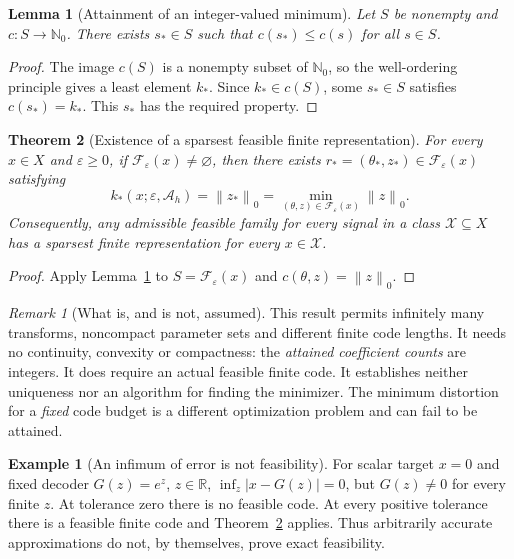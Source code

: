 \documentclass[11pt,a4paper]{article}
\newtheorem{theorem}{Theorem}
\newtheorem{lemma}[theorem]{Lemma}
\theoremstyle{definition}
\newtheorem{example}{Example}
\theoremstyle{remark}
\newtheorem*{remark}{Remark}
\newcommand{\R}{\mathbb R}
\newcommand{\N}{\mathbb N}
\newcommand{\norm}[1]{\left\lVert#1\right\rVert}
\begin{document}
\begin{lemma}[Attainment of an integer-valued minimum]\label{lem:integer}
Let $S$ be nonempty and $c:S\to\N_0$. There exists $s_*\in S$ such that
$c(s_*)\leq c(s)$ for all $s\in S$.
\end{lemma}
\begin{proof}
The image $c(S)$ is a nonempty subset of $\N_0$, so the well-ordering principle
gives a least element $k_*$. Since $k_*\in c(S)$, some $s_*\in S$ satisfies
$c(s_*)=k_*$. This $s_*$ has the required property.
\end{proof}

\begin{theorem}[Existence of a sparsest feasible finite representation]\label{thm:existence}
For every $x\in X$ and $\varepsilon\geq0$, if
$\mathcal F_\varepsilon(x)\neq\varnothing$, then there exists
$r_*=(\theta_*,z_*)\in\mathcal F_\varepsilon(x)$ satisfying
\[
k_*(x;\varepsilon,\mathcal A_h)
=\norm{z_*}_0
=\min_{(\theta,z)\in\mathcal F_\varepsilon(x)}\norm{z}_0.
\]
Consequently, any admissible feasible family for every signal in a class
$\mathcal X\subseteq X$ has a sparsest finite representation for every
$x\in\mathcal X$.
\end{theorem}
\begin{proof}
Apply Lemma~\ref{lem:integer} to
$S=\mathcal F_\varepsilon(x)$ and $c(\theta,z)=\norm{z}_0$.
\end{proof}

\begin{remark}[What is, and is not, assumed]
This result permits infinitely many transforms, noncompact parameter sets and
different finite code lengths. It needs no continuity, convexity or compactness:
the \emph{attained coefficient counts} are integers. It does require an actual
feasible finite code. It establishes neither uniqueness nor an algorithm for
finding the minimizer. The minimum distortion for a \emph{fixed} code budget is
a different optimization problem and can fail to be attained.
\end{remark}

\begin{example}[An infimum of error is not feasibility]\label{ex:infimum}
For scalar target $x=0$ and fixed decoder $G(z)=e^z$, $z\in\R$,
$\inf_z|x-G(z)|=0$, but $G(z)\neq0$ for every finite $z$. At tolerance zero there
is no feasible code. At every positive tolerance there is a feasible finite
code and Theorem~\ref{thm:existence} applies. Thus arbitrarily accurate
approximations do not, by themselves, prove exact feasibility.
\end{example}
\end{document}
